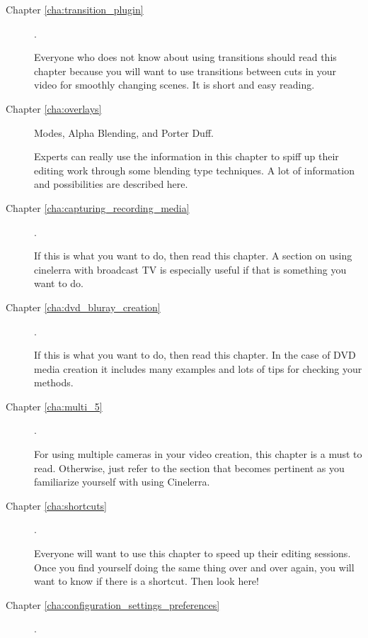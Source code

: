 \begin{description}
    \item[Chapter \ref{cha:transition_plugin}] .

        Everyone who does not know about using transitions should read this chapter because you will want to use transitions between cuts in your video for smoothly changing scenes. 
        It is short and easy reading.

    \item[Chapter \ref{cha:overlays}]  Modes, Alpha Blending, and Porter Duff.

        Experts can really use the information in this chapter to spiff up their editing work through some blending type techniques. 
        A lot of information and possibilities are described here.

    \item[Chapter \ref{cha:capturing_recording_media}] .

        If this is what you want to do, then read this chapter. 
        A section on using cinelerra with broadcast TV is especially useful if that is something you want to do.

    \item[Chapter \ref{cha:dvd_bluray_creation}] .

        If this is what you want to do, then read this chapter. 
        In the case of DVD media creation it includes many examples and lots of tips for checking your methods. 

    \item[Chapter \ref{cha:multi_5}] .

        For using multiple cameras in your video creation, this chapter is a must to read. Otherwise, just refer
        to the section that becomes pertinent as you familiarize yourself with using Cinelerra.

    \item[Chapter \ref{cha:shortcuts}] .

        Everyone will want to use this chapter to speed up their editing sessions. 
        Once you find yourself doing the same thing over and over again, you will want to know if there is a shortcut. Then look here!  

    \item[Chapter \ref{cha:configuration_settings_preferences}] .


\end{description}

